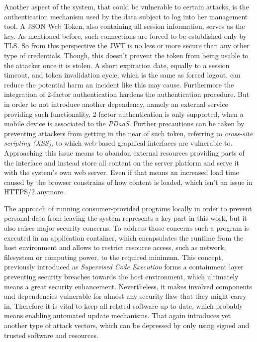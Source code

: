 \documentclass[12pt,english,a4paper,titlepage,cleardoublepage=empty,dottedtoc]{report}
\begin{document}
Another aspect of the system, that could be vulnerable to certain
attacks, is the authentication mechanism used by the data subject to log
into her management tool. A JSON Web Token, also containing all session
information, serves as the key. As mentioned before, such connections
are forced to be established only by TLS. So from this perspective the
JWT is no less or more secure than any other type of credentials.
Though, this doesn't prevent the token from being usable to the attacker
once it is stolen. A short expiration date, equally to a session
timeout, and token invalidation cycle, which is the same as forced
logout, can reduce the potential harm an incident like this may cause.
Furthermore the integration of 2-factor authentication hardens the
authentication procedure. But in order to not introduce another
dependency, namely an external service providing such functionality,
2-factor authentication is only supported, when a mobile device is
associated to the \emph{PDaaS}. Further precautions can be taken by
preventing attackers from getting in the near of such token, referring
to \emph{cross-site scripting (XSS)}, to which web-based graphical
interfaces are vulnerable to. Approaching this issue means to abandon
external resources providing parts of the interface and instead store
all content on the server platform and serve it with the system's own
web server. Even if that means an increased load time caused by the
browser constrains of how content is loaded, which isn't an issue in
HTTPS/2 anymore.

The approach of running consumer-provided programs locally in order to
prevent personal data from leaving the system represents a key part in
this work, but it also raises major security concerns. To address those
concerns such a program is executed in an application container, which
encapsulates the runtime from the host environment and allows to
restrict resource access, such as network, filesystem or computing
power, to the required minimum. This concept, previously introduced as
\emph{Supervised Code Execution} forms a containment layer preventing
security breaches towards the host environment, which ultimately means a
great security enhancement. Nevertheless, it makes involved components
and dependencies vulnerable for almost any security flaw that they might
carry in. Therefore it is vital to keep all related software up to date,
which probably means enabling automated update mechanisms. That again
introduces yet another type of attack vectors, which can be depressed by
only using signed and trusted software and resources.
\end{document}
